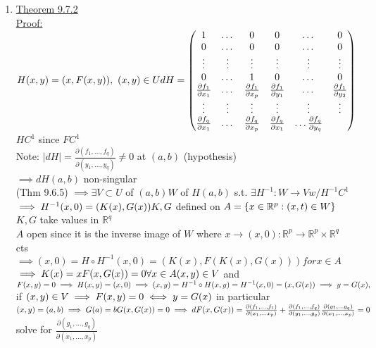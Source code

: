 \documentclass[12pt]{amsart}
\begin{document}
\begin{enumerate}
\hdashrule[0.5ex][c]{\linewidth}{0.5pt}{1.5mm}


\item \underline{Theorem 9.7.2}\\
\underline{Proof:}\\
$H(x,y) = (x,F(x,y)),\,\, (x,y) \in U\\
dH = \begin{pmatrix} 
	1 &  \dots & 0 &0 & \dots & 0 \\ 
	0 & \dots & 0 & 0 & \dots & 0 \\ 
	\vdots & \vdots & \vdots & \vdots & \vdots & \vdots\\
	0 & \dots & 1 & 0 & \dots & 0 \\
	\frac{\partial f_1}{\partial x_1} & \dots & \frac{\partial f_1}{\partial x_p} & \frac{\partial f_1}{\partial y_1} & \dots & \frac{\partial f_1}{\partial y_2} \\
	\vdots & \vdots & \vdots & \vdots & \vdots & \vdots\\
	\frac{\partial f_q}{\partial x_1} & \dots & \frac{\partial f_q}{\partial x_p} & \frac{\partial f_q}{\partial x_1} & \dots \frac{\partial f_q}{\partial y_q} 
\end{pmatrix}$\\
$H C^1$ since $F C^1$\\
Note: $|dH| = \frac{\partial (f_1, \dots, f_q)}{\partial (y_1, \dots, y_q)} \neq 0$ at $(a,b)$ (hypothesis)\\
$\implies d H(a,b)$ non-singular\\
(Thm 9.6.5) $\implies \exists V \subset U$ of $(a,b) W$ of $H(a,b)$ s.t. $\exists H^{-1}: W \rightarrow V w/ H^{-1} C^1$\\
$\implies H^{-1}(x,0) = (K(x), G(x))\\
K, G$ defined on $A = \{ x \in \mathbb{R}^p: (x,t) \in W \}\\$
$K, G$ take values in $\mathbb{R}^q$\\
$A$ open since it is the inverse image of $W$ where $x \rightarrow (x,0) : \mathbb{R}^p \rightarrow \mathbb{R}^p \times \mathbb{R}^q$ cts\\
$\implies (x,0) = H \circ H^{-1}(x,0) = (K(x), F(K(x),G(x))) for x \in A$
$\implies K(x) = x F(x, G(x)) = 0 \forall x\in A\\
(x,y) \in V$ and $F(x,y) = 0 \implies H(x,y) = (x,0)\\
\implies (x,y) = H^{-1} \circ H(x,y) = H^{-1} (x,0) = (x, G(x))\\
\implies y= G(x),$ if $(x,y) \in V \implies F(x,y) = 0 \iff y= G(x)\\$
in particular $(x,y) = (a,b) \implies G(a) = b\\
G(x,G(x)) = 0 \implies d F(x,G(x))\\
= \frac{\partial (f_1, \dots, f_1)}{\partial (x_1, \dots x_p)} + \frac{\partial (f_1, \dots, f_q)}{\partial (y_1, \dots , y_q)} \frac{\partial (g_1, \dots g_q)}{\partial (x_1, \dots , x_p)} =0 \\$
solve for $\frac{\partial (g_1, \dots , g_q)}{\partial (x_1, \dots , x_p)}$\\



\end{enumerate}
\end{document}
